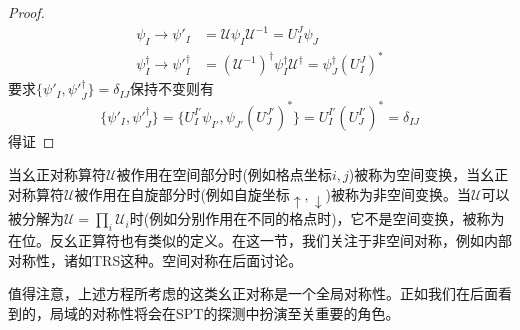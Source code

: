 \documentclass{article}
\numberwithin{equation}{subsection}
\newtheorem{proof}{proof}
\begin{document}
\begin{proof}
    \begin{equation}
        \begin{split}
            \psi_I\rightarrow\psi'_I&=\mathcal{U}\psi_I\mathcal{U}^{-1}=U_I^J\psi_J\\
            \psi_I^\dagger\rightarrow{\psi'}_I^\dagger&=(\mathcal{U}^{-1})^\dagger\psi_I^\dagger\mathcal{U}^\dagger=\psi_J^\dagger(U^{J}_{I})^*
        \end{split}
    \end{equation}
    要求$\{\psi'_I,{\psi'}_J^\dagger\}=\delta_{IJ}$保持不变则有
    \begin{equation}
        \{\psi'_I,{\psi'}_J^\dagger\}=\{U_I^{I'}\psi_{I'},\psi_{J'}(U_J^{J'})^*\}=U_I^{I'}(U_J^{I'})^*=\delta_{IJ}
    \end{equation}
    得证
\end{proof}
当幺正对称算符$\mathcal{U}$被作用在空间部分时(例如格点坐标$i,j$)被称为空间变换，当幺正对称算符$\mathcal{U}$被作用在自旋部分时(例如自旋坐标$\uparrow,\downarrow$)被称为非空间变换。当$\mathcal{U}$可以被分解为$\mathcal{U}=\prod_{i}\mathcal{U}_i$时(例如分别作用在不同的格点时)，它不是空间变换，被称为在位。反幺正算符也有类似的定义。在这一节，我们关注于非空间对称，例如内部对称性，诸如TRS这种。空间对称在后面讨论。

值得注意，上述方程所考虑的这类幺正对称是一个全局对称性。正如我们在后面看到的，局域的对称性将会在SPT的探测中扮演至关重要的角色。
\end{document}
